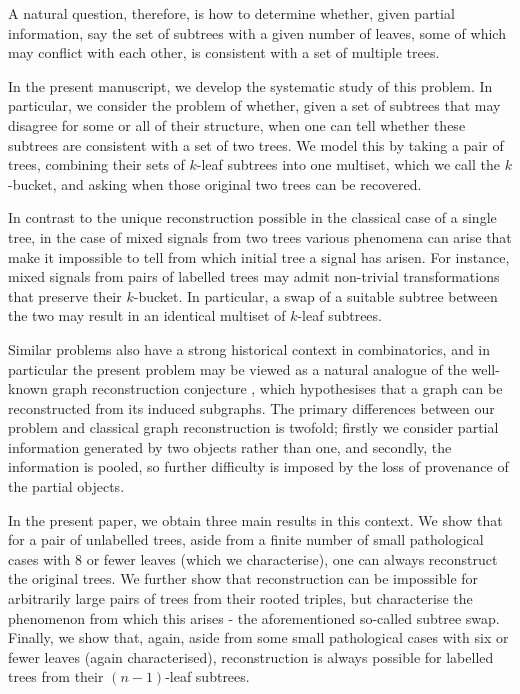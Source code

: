 \documentclass[12pt]{article}
\theoremstyle{definition}
\begin{document}
A natural question, therefore, is how to determine whether, given partial information, say the set of subtrees with a given number of leaves, some of which may conflict with each other, is consistent with a set of multiple trees.

In the present manuscript, we develop the systematic study of this problem. In particular, we consider the problem of whether, given a set of subtrees that may disagree for some or all of their structure, when one can tell whether these subtrees are consistent with a set of two trees. We model this by taking a pair of trees, combining their sets of $k$-leaf subtrees into one multiset, which we call the $k$-bucket, and asking when those original two trees can be recovered.

In contrast to the unique reconstruction possible in the classical case of a single tree, in the case of mixed signals from two trees various phenomena can arise that make it impossible to tell from which initial tree a signal has arisen. For instance, mixed signals from pairs of labelled trees may admit non-trivial transformations that preserve their $k$-bucket. In particular, a swap of a suitable subtree between the two may result in an identical multiset of $k$-leaf subtrees.

Similar problems also have a strong historical context in combinatorics, and in particular the present problem may be viewed as a natural analogue of the well-known graph reconstruction conjecture \cite{graph_reconstruction_survey}, which hypothesises that a graph can be reconstructed from its induced subgraphs. The primary differences between our problem and classical graph reconstruction is twofold; firstly we consider partial information generated by two objects rather than one, and secondly, the information is pooled, so further difficulty is imposed by the loss of provenance of the partial objects.

In the present paper, we obtain three main results in this context. We show that for a pair of unlabelled trees, aside from a finite number of small pathological cases with $8$ or fewer leaves (which we characterise), one can always reconstruct the original trees. We further show that reconstruction can be impossible for arbitrarily large pairs of trees from their rooted triples, but characterise the phenomenon from which this arises - the aforementioned so-called subtree swap. Finally, we show that, again, aside from some small pathological cases with six or fewer leaves (again characterised), reconstruction is always possible for labelled trees from their $(n-1)$-leaf subtrees.
\end{document}
